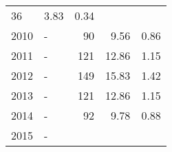 \begin{longtable}{lXrrr}
       \num{36} &
       \num[round-mode=places,round-precision=2]{3,83} &
         \num[round-mode=places,round-precision=2]{0,34} \\

     2010 &
     \multicolumn{1}{X}{ -  } &


       \num{90} &
       \num[round-mode=places,round-precision=2]{9,56} &
         \num[round-mode=places,round-precision=2]{0,86} \\

     2011 &
     \multicolumn{1}{X}{ -  } &


       \num{121} &
       \num[round-mode=places,round-precision=2]{12,86} &
         \num[round-mode=places,round-precision=2]{1,15} \\

     2012 &
     \multicolumn{1}{X}{ -  } &


       \num{149} &
       \num[round-mode=places,round-precision=2]{15,83} &
         \num[round-mode=places,round-precision=2]{1,42} \\

     2013 &
     \multicolumn{1}{X}{ -  } &


       \num{121} &
       \num[round-mode=places,round-precision=2]{12,86} &
         \num[round-mode=places,round-precision=2]{1,15} \\

     2014 &
     \multicolumn{1}{X}{ -  } &


       \num{92} &
       \num[round-mode=places,round-precision=2]{9,78} &
         \num[round-mode=places,round-precision=2]{0,88} \\

     2015 &
     \multicolumn{1}{X}{ -  } &



\end{longtable}
